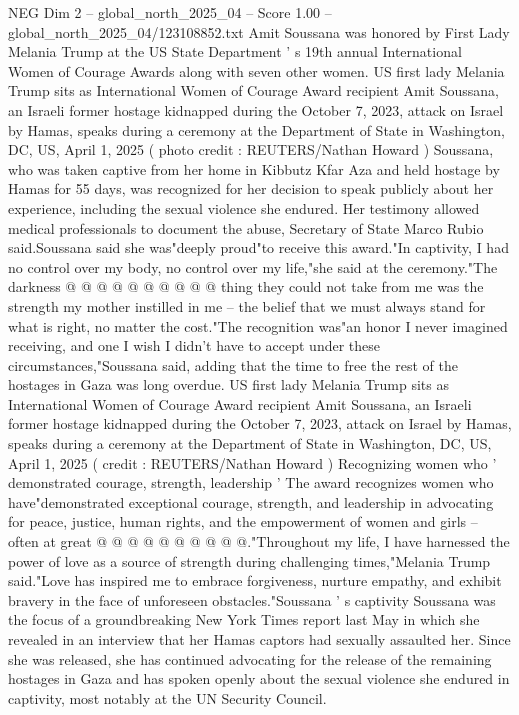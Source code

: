 \begin{textsample}{NEG Dim 2 – global\_north\_2025\_04 – Score 1.00 – global\_north\_2025\_04/123108852.txt}  \label{ex:f2_neg_128}
Amit Soussana was honored by First Lady Melania Trump at the US State Department ' s 19th annual International Women of Courage Awards along with seven other women.
US first lady Melania Trump sits as International Women of Courage Award recipient Amit Soussana, an Israeli former hostage kidnapped during the October 7, 2023, attack on Israel by Hamas, speaks during a ceremony at the Department of State in Washington, DC, US, April 1, 2025 ( photo credit : REUTERS/Nathan Howard ) Soussana, who was taken captive from her home in Kibbutz Kfar Aza and held hostage by Hamas for 55 days, was recognized for her decision to speak publicly about her experience, including the sexual violence she endured.
Her testimony allowed medical professionals to document the abuse, Secretary of State Marco Rubio said.Soussana said she was"deeply proud"to receive this award."In captivity, I had no control over my body, no control over my life,"she said at the ceremony."The darkness @ @ @ @ @ @ @ @ @ @ thing they could not take from me was the strength my mother instilled in me -- the belief that we must always stand for what is right, no matter the cost."The recognition was"an honor I never imagined receiving, and one I wish I didn't have to accept under these circumstances,"Soussana said, adding that the time to free the rest of the hostages in Gaza was long overdue.
US first lady Melania Trump sits as International Women of Courage Award recipient Amit Soussana, an Israeli former hostage kidnapped during the October 7, 2023, attack on Israel by Hamas, speaks during a ceremony at the Department of State in Washington, DC, US, April 1, 2025 ( credit : REUTERS/Nathan Howard ) Recognizing women who ' demonstrated courage, strength, leadership ' The award recognizes women who have"demonstrated exceptional courage, strength, and leadership in advocating for peace, justice, human rights, and the empowerment of women and girls -- often at great @ @ @ @ @ @ @ @ @ @."Throughout my life, I have harnessed the power of love as a source of strength during challenging times,"Melania Trump said."Love has inspired me to embrace forgiveness, nurture empathy, and exhibit bravery in the face of unforeseen obstacles."Soussana ' s captivity Soussana was the focus of a groundbreaking New York Times report last May in which she revealed in an interview that her Hamas captors had sexually assaulted her.
Since she was released, she has continued advocating for the release of the remaining hostages in Gaza and has spoken openly about the sexual violence she endured in captivity, most notably at the UN Security Council.

\end{textsample}
